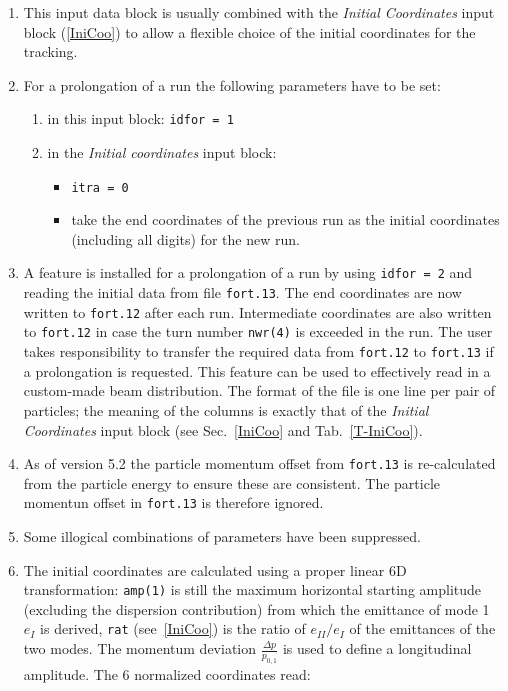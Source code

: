 \begin{enumerate}
    \item This input data block is usually combined with the \textit{Initial Coordinates} input block (\ref{IniCoo}) to allow a flexible choice of the initial coordinates for the tracking.
    \item For a prolongation of a run the following parameters have to be set:
    \begin{enumerate}
        \item in this input block: \texttt{idfor = 1}
        \item in the \textit{Initial coordinates} input block:
        \begin{itemize}
            \item \texttt{itra = 0}
            \item take the end coordinates of the previous run as the initial coordinates (including all digits) for the new run.
        \end{itemize}
    \end{enumerate}
    \item A feature is installed for a prolongation of a run by using \texttt{idfor = 2} and reading the initial data from file \texttt{fort.13}. The end coordinates are now written to \texttt{fort.12} after each run. Intermediate coordinates are also written to \texttt{fort.12} in case the turn number \texttt{nwr(4)} is exceeded in the run. The user takes responsibility to transfer the required data from \texttt{fort.12} to \texttt{fort.13} if a prolongation is requested. This feature can be used to effectively read in a custom-made beam distribution. The format of the file is one line per pair of particles; the meaning of the columns is exactly that of the \textit{Initial Coordinates} input block (see Sec.~\ref{IniCoo} and Tab.~\ref{T-IniCoo}).
    \item As of version 5.2 the particle momentum offset from \texttt{fort.13} is re-calculated from the particle energy to ensure these are consistent. The particle momentun offset in \texttt{fort.13} is therefore ignored.
    \item Some illogical combinations of parameters have been suppressed.
    \item The initial coordinates are calculated using a proper linear 6D transformation: \texttt{amp(1)} is still the maximum horizontal starting amplitude (excluding the dispersion contribution) from which the emittance of mode 1 $e_I$ is derived, \texttt{rat} (see~\ref{IniCoo}) is the ratio of $e_{II}/e_I$ of the emittances of the two modes. The momentum deviation $\frac{\Delta p}{p_{0,1}}$ is used to define a longitudinal amplitude. The 6 normalized coordinates read:

\end{enumerate}
